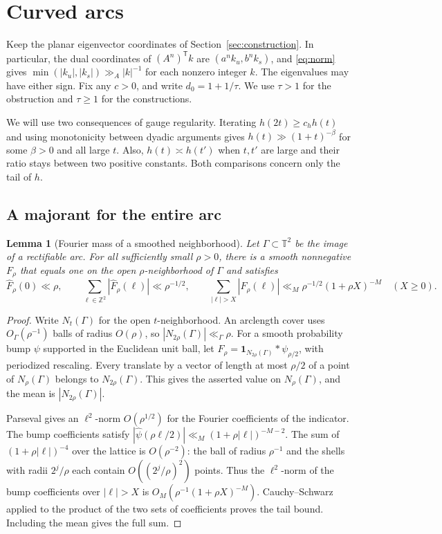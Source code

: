 \documentclass[11pt,a4paper,reqno]{amsart}
\newtheorem{lemma}[theorem]{Lemma}
\theoremstyle{definition}
\theoremstyle{remark}
\numberwithin{equation}{section}
\begin{document}
\section{Curved arcs}\label{sec:curves}
Keep the planar eigenvector coordinates of Section~\ref{sec:construction}.
In particular, the dual coordinates of \((A^n)^{\mathsf T}k\) are
\((a^n k_u,b^n k_s)\), and \eqref{eq:norm} gives
\(\min(|k_u|,|k_s|)\gg_A |k|^{-1}\) for each nonzero integer \(k\).
The eigenvalues may have either sign. Fix any \(c>0\), and write
\(d_0=1+1/\tau\). We use \(\tau>1\) for the obstruction and
\(\tau\ge1\) for the constructions.

We will use two consequences of gauge regularity. Iterating
\(h(2t)\ge c_h h(t)\) and using monotonicity between dyadic arguments
gives \(h(t)\gg (1+t)^{-\beta}\) for some \(\beta>0\) and all large
\(t\). Also, \(h(t)\asymp h(t')\) when \(t,t'\) are large and their
ratio stays between two positive constants. Both comparisons concern
only the tail of \(h\).

\subsection{A majorant for the entire arc}
\begin{lemma}[Fourier mass of a smoothed neighborhood]\label{lem:arc-majorant}
Let \(\Gamma\subset\mathbb T^2\) be the image of a rectifiable arc.
For all sufficiently small \(\rho>0\), there is a smooth nonnegative
\(F_\rho\) that equals one on the open \(\rho\)-neighborhood of \(\Gamma\)
and satisfies
\begin{equation}\label{eq:curve-majorant}
 \widehat F_\rho(0)\ll \rho,\qquad
 \sum_{\ell\in\mathbb Z^2}|\widehat F_\rho(\ell)|\ll \rho^{-1/2},
 \qquad
 \sum_{|\ell|>X}|\widehat F_\rho(\ell)|
       \ll_M \rho^{-1/2}(1+\rho X)^{-M}
 \quad(X\ge0).
\end{equation}
\end{lemma}
\begin{proof}
Write \(N_t(\Gamma)\) for the open \(t\)-neighborhood. An arclength cover
uses \(O_\Gamma(\rho^{-1})\) balls of radius \(O(\rho)\), so
\(|N_{2\rho}(\Gamma)|\ll_\Gamma\rho\). For a smooth probability bump
\(\psi\) supported in the Euclidean unit ball, let
\(F_\rho=\mathbf 1_{N_{2\rho}(\Gamma)}*\psi_{\rho/2}\), with periodized
rescaling. Every translate by a vector of length at most \(\rho/2\)
of a point of \(N_\rho(\Gamma)\) belongs to \(N_{2\rho}(\Gamma)\).
This gives the asserted value on \(N_\rho(\Gamma)\), and the mean is
\(|N_{2\rho}(\Gamma)|\).

Parseval gives an \(\ell^2\)-norm \(O(\rho^{1/2})\) for the Fourier
coefficients of the indicator. The bump coefficients satisfy
\(|\widehat\psi(\rho\ell/2)|\ll_M(1+\rho|\ell|)^{-M-2}\).
The sum of \((1+\rho|\ell|)^{-4}\) over the lattice is \(O(\rho^{-2})\):
the ball of radius \(\rho^{-1}\) and the shells with radii
\(2^j/\rho\) each contain \(O((2^j/\rho)^2)\) points. Thus the
\(\ell^2\)-norm of the bump coefficients over \(|\ell|>X\) is
\(O_M(\rho^{-1}(1+\rho X)^{-M})\). Cauchy--Schwarz applied to the
product of the two sets of coefficients proves the tail bound.
Including the mean gives the full sum.
\end{proof}
\end{document}

